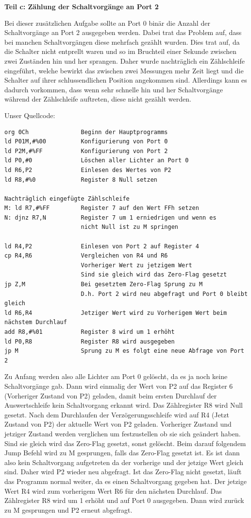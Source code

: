 \textbf{Teil c: Zählung der Schaltvorgänge an Port 2}

Bei dieser zusätzlichen Aufgabe sollte an Port 0 binär die Anzahl der Schaltvorgänge an Port 2 ausgegeben werden. Dabei trat das Problem auf, dass bei manchen Schaltvorgängen diese mehrfach gezählt wurden. Dies trat auf, da die Schalter nicht entprellt waren und so im Bruchteil einer Sekunde zwischen zwei Zuständen hin und her sprangen. Daher wurde nachträglich ein Zählschleife eingeführt, welche bewirkt das zwischen zwei Messungen mehr Zeit liegt und die Schalter auf ihrer schlussendlichen Position angekommen sind. Allerdings kann es dadurch vorkommen, dass wenn sehr schnelle hin und her Schaltvorgänge während der Zählschleife auftreten, diese nicht gezählt werden. 

Unser Quellcode:

\begin{verbatim}
org 0Ch               Beginn der Hauptprogramms                
ld P01M,#%00          Konfigurierung von Port 0
ld P2M,#%FF           Konfigurierung von Port 2
ld P0,#0              Löschen aller Lichter an Port 0 
ld R6,P2              Einlesen des Wertes von P2
ld R8,#%0             Register 8 Null setzen

Nachträglich eingefügte Zählschleife
M: ld R7,#%FF         Register 7 auf den Wert FFh setzen
N: djnz R7,N          Register 7 um 1 erniedrigen und wenn es 
                      nicht Null ist zu M springen

ld R4,P2              Einlesen von Port 2 auf Register 4
cp R4,R6              Vergleichen von R4 und R6 
                      Vorheriger Wert zu jetzigem Wert
                      Sind sie gleich wird das Zero-Flag gesetzt
jp Z,M                Bei gesetztem Zero-Flag Sprung zu M
                      D.h. Port 2 wird neu abgefragt und Port 0 bleibt gleich
ld R6,R4              Jetziger Wert wird zu Vorherigem Wert beim nächstem Durchlauf
add R8,#%01           Register 8 wird um 1 erhöht
ld P0,R8              Register R8 wird ausgegeben
jp M                  Sprung zu M es folgt eine neue Abfrage von Port 2
\end{verbatim}

Zu Anfang werden also alle Lichter am Port 0 gelöscht, da es ja noch keine Schaltvorgänge gab. Dann wird einmalig der Wert von P2 auf das Register 6 (Vorheriger Zustand von P2) geladen, damit beim ersten Durchlauf der Auswertschleife kein Schaltvorgang erkannt wird. Das Zählregister R8 wird Null gesetzt. Nach dem Durchlaufen der Verzögerungsschleife wird auf R4 (Jetzt Zustand von P2) der aktuelle Wert von P2 geladen. Vorheriger Zustand und jetziger Zustand werden verglichen um festzustellen ob sie sich geändert haben. Sind sie gleich wird das Zero-Flag gesetzt, sonst gelöscht. Beim darauf folgendem Jump Befehl wird zu M gesprungen, falls das Zero-Flag gesetzt ist. Es ist dann also kein Schaltvorgang aufgetreten da der vorherige und  der jetzige Wert gleich sind. Daher wird P2 wieder neu abgefragt. Ist das Zero-Flag nicht gesetzt, läuft das Programm normal weiter, da es einen Schaltvorgang gegeben hat. Der jetzige Wert R4 wird zum vorherigem Wert R6 für den nächsten Durchlauf. Das Zählregister R8 wird um 1 erhöht und auf Port 0 ausgegeben. Dann wird zurück zu M gesprungen und P2 erneut abgefragt.

